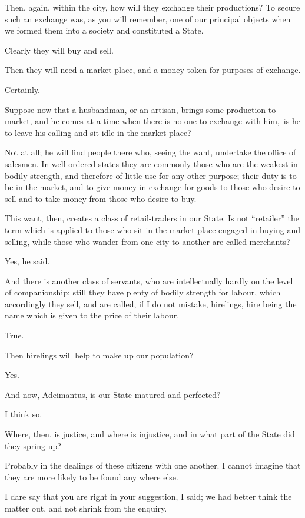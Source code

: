 Then, again, within the city, how will they exchange their productions?
To secure such an exchange was, as you will remember, one of our
principal objects when we formed them into a society and constituted a
State.

Clearly they will buy and sell.

Then they will need a market-place, and a money-token for purposes of
exchange.

Certainly.

Suppose now that a husbandman, or an artisan, brings some production
to market, and he comes at a time when there is no one to exchange with
him,--is he to leave his calling and sit idle in the market-place?

Not at all; he will find people there who, seeing the want, undertake
the office of salesmen. In well-ordered states they are commonly those
who are the weakest in bodily strength, and therefore of little use for
any other purpose; their duty is to be in the market, and to give money
in exchange for goods to those who desire to sell and to take money from
those who desire to buy.

This want, then, creates a class of retail-traders in our State. Is
not ``retailer'' the term which is applied to those who sit in the
market-place engaged in buying and selling, while those who wander from
one city to another are called merchants?

Yes, he said.

And there is another class of servants, who are intellectually hardly
on the level of companionship; still they have plenty of bodily strength
for labour, which accordingly they sell, and are called, if I do not
mistake, hirelings, hire being the name which is given to the price of
their labour.

True.

Then hirelings will help to make up our population?

Yes.

And now, Adeimantus, is our State matured and perfected?

I think so.

Where, then, is justice, and where is injustice, and in what part of the
State did they spring up?

Probably in the dealings of these citizens with one another. I cannot
imagine that they are more likely to be found any where else.

I dare say that you are right in your suggestion, I said; we had better
think the matter out, and not shrink from the enquiry.

